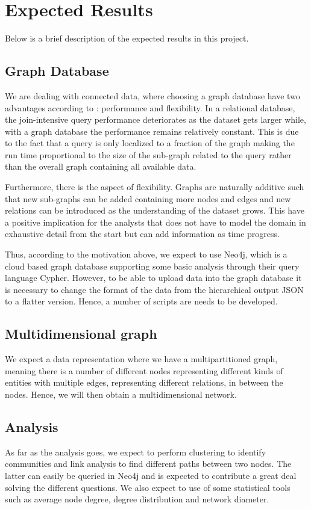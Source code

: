 \chapter{Expected Results}
Below is a brief description of the expected results in this project.

\section{Graph Database}
We are dealing with connected data, where choosing a graph database have two advantages according to \citet{robinson2013}: performance and flexibility. In a relational database, the join-intensive query performance deteriorates as the dataset gets larger while, with a graph database the performance remains relatively constant. This is due to the fact that a query is only localized to a fraction of the graph making the run time proportional to the size of the sub-graph related to the query rather than the overall graph containing all available data.

Furthermore, there is the aspect of flexibility. Graphs are naturally additive \cite{robinson2013} such that new sub-graphs can be added containing more nodes and edges and new relations can be introduced as the understanding of the dataset grows. This have a positive implication for the analysts that does not have to model the domain in exhaustive detail from the start but can add information as time progress. 

Thus, according to the motivation above, we expect to use Neo4j, which is a cloud based graph database supporting some basic analysis through their query language Cypher. However, to be able to upload data into the graph database it is necessary to change the format of the data from the hierarchical output JSON to a flatter version. Hence, a number of scripts are needs to be developed. 

\section{Multidimensional graph}
We expect a data representation where we have a multipartitioned graph, meaning there is a number of different nodes representing different kinds of entities with multiple edges, representing different relations, in between the nodes. Hence, we will then obtain a multidimensional network. 

\section{Analysis}
As far as the analysis goes, we expect to perform clustering to identify communities and link analysis to find different paths between two nodes. The latter can easily be queried in Neo4j and is expected to contribute a great deal solving the different questions. We also expect to use of some statistical tools such as average node degree, degree distribution and network diameter.


